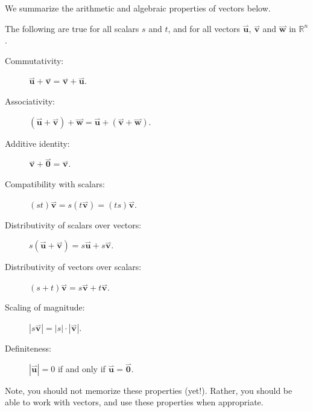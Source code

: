\documentclass{ximera}
\renewcommand{\vec}[1]{{\overset{\boldsymbol{\rightharpoonup}}{\mathbf{#1}}}}
\begin{document}
We summarize the arithmetic and algebraic properties of vectors
below.

\begin{theorem}
The following are true for all scalars $s$ and $t$, and for all
vectors $\vec u$, $\vec v$ and $\vec w$ in
$\mathbb{R}^n$.
\begin{description}
\item[Commutativity:] $\vec u+\vec v = \vec v+\vec u$.
\item[Associativity:] $(\vec u+\vec v)+\vec w = \vec u+(\vec v+\vec w)$.
\item[Additive identity:] $\vec v+\vec 0 = \vec v$.
\item[Compatibility with scalars:] $(st)\vec v= s(t\vec v) = (ts)\vec{v}$.
\item[Distributivity of scalars over vectors:] $s(\vec u+\vec v) = s\vec u+s\vec v$.
\item[Distributivity of vectors over scalars:] $(s+t)\vec v = s\vec v+t\vec v$.
\item[Scaling of magnitude:] $|s\vec v| = |s|\cdot|\vec v|$.
\item[Definiteness:] $|\vec{u}| = 0$ if and only if $\vec u = \vec 0$.
\end{description}
\end{theorem}
Note, you should not memorize these properties (yet!). Rather, you should be
able to work with vectors, and use these properties when appropriate.
\end{document}

